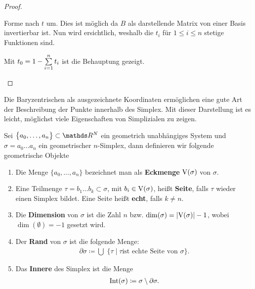\begin{Lem}
\begin{proof}
\begin{description}
      Forme nach $t$ um. Dies ist möglich da $B$ als darstellende
      Matrix von einer Basis invertierbar ist. Nun wird ersichtlich,
      weshalb die $t_i$ für $1 \leq i \leq n$ stetige Funktionen sind.


      Mit $t_0 = 1 - \sp{1}{n} t_i$ ist die Behauptung gezeigt.
    \end{description}
  \end{proof}
\end{Lem}

Die Baryzentrischen als ausgezeichnete Koordinaten ermöglichen eine
gute Art der Beschreibung der Punkte innerhalb des Simplex. Mit dieser
Darstellung ist es leicht, möglichst viele Eigenschaften von Simplizialen
zu zeigen.

\begin{Def}
  Sei $\sset{a_0,\ldots ,a_n} \subset \R^N$ ein geometrich
  unabhängiges System und $\sigma = a_0 \ldots a_n$ ein geometrischer
  $n$-Simplex, dann definieren wir folgende geometrische Objekte
  \begin{enumerate}[\textbullet]
  \item Die Menge $\{ a_0 , \ldots , a_n \}$ bezeichnet man als
    \textbf{Eckmenge} $\V(\sigma)$ von $\sigma$.
  \item Eine Teilmenge $\tau = b_1 \ldots b_k \subset \sigma$, mit
    $b_i \in \V(\sigma)$, heißt \textbf{Seite}, falls $\tau$ wieder
    einen Simplex bildet. Eine Seite heißt \textbf{echt}, falls
    $k \neq n$.
  \item Die \textbf{Dimension} von $\sigma$ ist die Zahl $n$ bzw.
    $\dim(\sigma) = \gr{\V(\sigma)} - 1$, wobei $\dim(\emptyset)=-1$
    gesetzt wird.
  \item Der \textbf{Rand} von $\sigma$ ist die folgende Menge:
    \begin{gather*}
      \partial\sigma \coloneqq \bigcup \; \bigl\{ \tau \; | \; \tau \text{
          ist echte Seite von } \sigma \bigr\}.
    \end{gather*}
  \item Das \textbf{Innere} des Simplex ist die Menge
    \begin{gather*}
    	\Int(\sigma) \coloneqq \sigma \setminus \partial\sigma.
    \end{gather*}
  \end{enumerate}
\end{Def}


